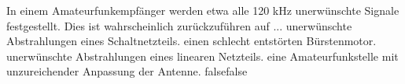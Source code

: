     {In einem Amateurfunkempfänger werden etwa alle 120 kHz unerwünschte Signale festgestellt. Dies ist wahrscheinlich zurückzuführen auf ...}
    {unerwünschte Abstrahlungen eines Schaltnetzteils.}
    {einen schlecht entstörten Bürstenmotor.}
    {unerwünschte Abstrahlungen eines linearen Netzteils.}
    {eine Amateurfunkstelle mit unzureichender Anpassung der Antenne.}
    {false}{false}